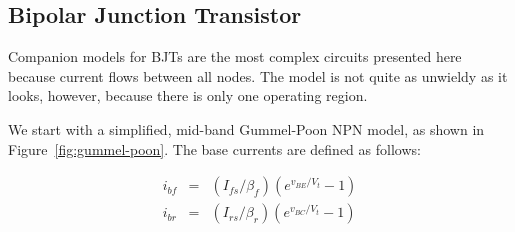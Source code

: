 \documentclass{article}
\begin{document}
\begin{table}[h]
\caption{PMOS companion model parameters \label{tb:pmos}}
\end{table}

\pagebreak

\subsection{Bipolar Junction Transistor}

Companion models for BJTs are the most complex circuits presented here because current flows between all nodes.  The model is not quite as unwieldy as it looks, however, because there is only one operating region.

We start with a simplified, mid-band Gummel-Poon NPN model, as shown in Figure~\ref{fig:gummel-poon}.  The base currents are defined as follows:

\begin{eqnarray}
i_{bf}&=&(I_{fs}/\beta_f)(e^{v_{BE}/V_t}-1) \\
i_{br}&=&(I_{rs}/\beta_r)(e^{v_{BC}/V_t}-1)
\end{eqnarray}
\end{document}
